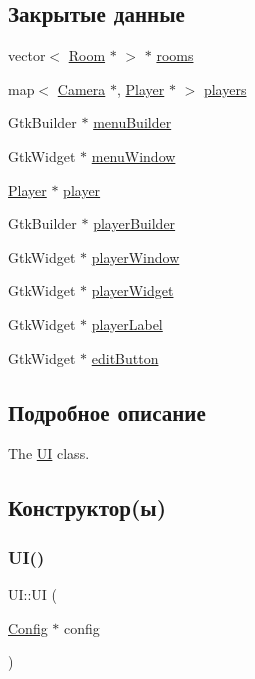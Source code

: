 \subsection*{Закрытые данные}
\begin{DoxyCompactItemize}
\item 
vector$<$ \hyperlink{class_room}{Room} $\ast$ $>$ $\ast$ \hyperlink{class_u_i_ad5e9a6fd88afba6e3a647c75be137d13}{rooms}
\item 
map$<$ \hyperlink{struct_camera}{Camera} $\ast$, \hyperlink{class_player}{Player} $\ast$ $>$ \hyperlink{class_u_i_ac5805ed5874e6c85ad1e607a9080793e}{players}
\item 
Gtk\+Builder $\ast$ \hyperlink{class_u_i_a971badc03d122b8de17d37fec58157eb}{menu\+Builder}
\item 
Gtk\+Widget $\ast$ \hyperlink{class_u_i_a279e69dd8e9b22b5a2a9cfa117ac4446}{menu\+Window}
\item 
\hyperlink{class_player}{Player} $\ast$ \hyperlink{class_u_i_a201dd0c0bb94e697654b923090776a12}{player}
\item 
Gtk\+Builder $\ast$ \hyperlink{class_u_i_a460a7c95bf2db2595070f7c2a9009cc4}{player\+Builder}
\item 
Gtk\+Widget $\ast$ \hyperlink{class_u_i_acf7b7529c59af602e9d2642d881e9fdc}{player\+Window}
\item 
Gtk\+Widget $\ast$ \hyperlink{class_u_i_a809a7dd49c802ce7805bb6e1036b7ace}{player\+Widget}
\item 
Gtk\+Widget $\ast$ \hyperlink{class_u_i_ae6090309318f008e3497552119fc46b9}{player\+Label}
\item 
Gtk\+Widget $\ast$ \hyperlink{class_u_i_a3ebae98c80dca1700ddbfcb7b5b56ee8}{edit\+Button}
\end{DoxyCompactItemize}


\subsection{Подробное описание}
The \hyperlink{class_u_i}{UI} class. 

\subsection{Конструктор(ы)}
\mbox{\label{class_u_i_a2b49119b809785f66dd97ce769ab1753}} 
\subsubsection{\texorpdfstring{U\+I()}{UI()}\hspace{0.1cm}{\footnotesize\ttfamily [1/2]}}
{\footnotesize\ttfamily U\+I\+::\+UI (\begin{DoxyParamCaption}\item[{\hyperlink{class_config}{Config} $\ast$}]{config }\end{DoxyParamCaption})}

